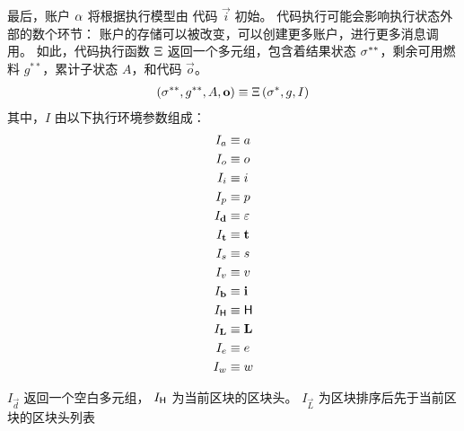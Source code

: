 最后，账户 $\mathbf{\alpha}$ 将根据执行模型由 \cvm 代码 $\vec{i}$ 初始。
代码执行可能会影响执行状态外部的数个环节：
账户的存储可以被改变，可以创建更多账户，进行更多消息调用。
如此，代码执行函数 $\mathrm{\Xi}$ 返回一个多元组，包含着结果状态 $\mathbf{\sigma}^{**}$，剩余可用燃料 $g^{**}$，累计子状态 $A$，和代码 $\vec{o}$。
\begin{align}
	\left(\mathbf{\sigma}^{**}, g^{**},  A, \mathbf{o} \right) \equiv \mathrm{\Xi}\left(\mathbf{\sigma}^*, g, I\right)
\end{align}
其中，$I$ 由以下执行环境参数组成：
\begin{align}
	I_a &\equiv a\\
	I_o &\equiv o\\
	I_i &\equiv i\\
	I_p &\equiv p\\
	I_{\mathbf{d}} &\equiv \mathbb{\varepsilon}\\
	I_{\mathbf{t}} & \equiv \mathbf{t}\\
	I_s &\equiv s\\
	I_v &\equiv v\\
	I_{\mathbf{b}} &\equiv \mathbf{i}\\
	I_{\textsf{H}} & \equiv \textsf{H} \\
	I_{\mathbf{L}} & \equiv \mathbf{L} \\ 
	I_e &\equiv e\\
	I_w &\equiv w
\end{align}

$I_{\vec{d}}$ 返回一个空白多元组，
$I_{\textsf{H}}$ 为当前区块的区块头。
$I_\vec{L}$ 为区块排序后先于当前区块的区块头列表

